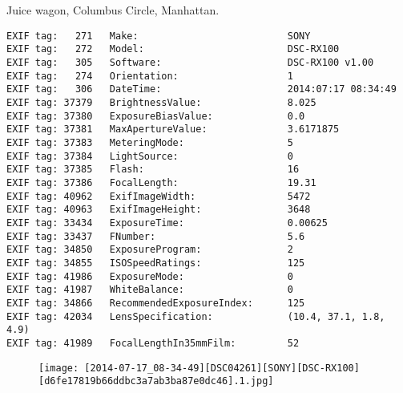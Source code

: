 \section{\protect{}}
\noindent Juice wagon, Columbus Circle, Manhattan.
\noindent
\begin{lstlisting}
EXIF tag:   271   Make:                          SONY
EXIF tag:   272   Model:                         DSC-RX100
EXIF tag:   305   Software:                      DSC-RX100 v1.00
EXIF tag:   274   Orientation:                   1
EXIF tag:   306   DateTime:                      2014:07:17 08:34:49
EXIF tag: 37379   BrightnessValue:               8.025
EXIF tag: 37380   ExposureBiasValue:             0.0
EXIF tag: 37381   MaxApertureValue:              3.6171875
EXIF tag: 37383   MeteringMode:                  5
EXIF tag: 37384   LightSource:                   0
EXIF tag: 37385   Flash:                         16
EXIF tag: 37386   FocalLength:                   19.31
EXIF tag: 40962   ExifImageWidth:                5472
EXIF tag: 40963   ExifImageHeight:               3648
EXIF tag: 33434   ExposureTime:                  0.00625
EXIF tag: 33437   FNumber:                       5.6
EXIF tag: 34850   ExposureProgram:               2
EXIF tag: 34855   ISOSpeedRatings:               125
EXIF tag: 41986   ExposureMode:                  0
EXIF tag: 41987   WhiteBalance:                  0
EXIF tag: 34866   RecommendedExposureIndex:      125
EXIF tag: 42034   LensSpecification:             (10.4, 37.1, 1.8, 4.9)
EXIF tag: 41989   FocalLengthIn35mmFilm:         52

\end{lstlisting}
\clearpage
\begin{figure}
\raggedleft
\texttt{[image: [2014-07-17\_08-34-49][DSC04261][SONY][DSC-RX100][d6fe17819b66ddbc3a7ab3ba87e0dc46].1.jpg]}
\end{figure}


\clearpage
